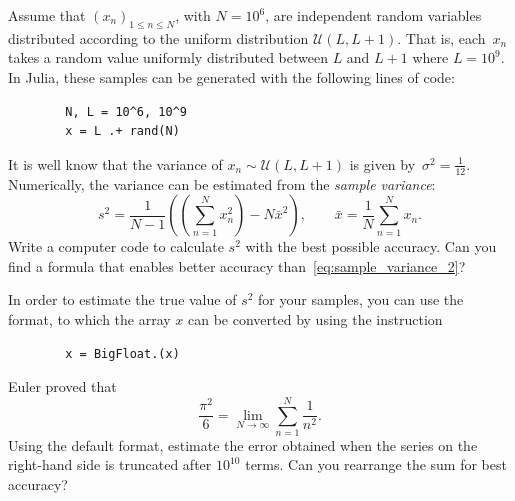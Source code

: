 \begin{compexercise}
    Assume that $(x_n)_{1 \leq n \leq N}$, with $N = 10^6$, are independent random variables distributed according to
    the uniform distribution $\mathcal U(L, L+1)$.
    That is, each~$x_n$ takes a random value uniformly distributed between $L$ and $L+1$ where $L = 10^9$.
    In Julia, these samples can be generated with the following lines of code:
    \begin{verbatim}
        N, L = 10^6, 10^9
        x = L .+ rand(N)
    \end{verbatim}
    It is well know that the variance of $x_n \sim \mathcal U(L, L+1)$ is given by~$\sigma^2 = \frac{1}{12}$.
    Numerically, the variance can be estimated from the \emph{sample variance}:
    \begin{equation}
        \label{eq:sample_variance_2}
        s^2 = \frac{1}{N-1} \left(\left(\sum_{n=1}^{N} x_n^2\right) - N \bar x^2 \right),
        \qquad \bar x = \frac{1}{N} \sum_{n=1}^{N} x_n.
    \end{equation}
    Write a computer code to calculate $s^2$ with the best possible accuracy.
    Can you find a formula that enables better accuracy than~\eqref{eq:sample_variance_2}?
\end{compexercise}

\begin{remark}
    In order to estimate the true value of $s^2$ for your samples,
    you can use the  format,
    to which the array $x$ can be converted by using the instruction
    \begin{verbatim}
        x = BigFloat.(x)
    \end{verbatim}
\end{remark}

\begin{compexercise}
    Euler proved that
    \[
        \frac{\pi^2}{6} = \lim_{N \to \infty} \sum_{n=1}^{N} \frac{1}{n^2}.
    \]
    Using the default  format,
    estimate the error obtained when the series on the right-hand side is truncated after $10^{10}$ terms.
    Can you rearrange the sum for best accuracy?
\end{compexercise}

